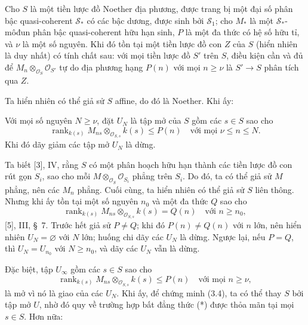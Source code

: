  Cho $S$ là một tiền lược đồ Noether địa phương, được trang
bị một đại số phân bậc quasi-coherent $\mathcal S_*$ có các bậc dương, được
sinh bởi $\mathcal S_1$; cho $M_*$ là một $\mathcal S_*$-môđun phân bậc quasi-coherent
hữu hạn sinh, $P$ là một đa thức có hệ số hữu tỉ, và $\nu$ là một số nguyên.
Khi đó tồn tại một tiền lược đồ con $Z$ của $S$ (hiển nhiên là duy nhất)
có tính chất sau: với mọi tiền lược đồ $S'$ trên $S$, điều kiện cần và đủ để
$M_n\otimes_{\mathcal O_S}\mathcal O_{S'}$ tự do địa phương hạng $P(n)$ với
mọi $n\geq\nu$ là $S'\longrightarrow S$ phân tích qua $Z$.

Ta hiển nhiên có thể giả sử $S$ affine, do đó là Noether. Khi ấy:

 Với mọi số nguyên $N\geq\nu$, đặt $U_N$ là tập mở của $S$
gồm các $s\in S$ sao cho
\[
\operatorname{rank}_{k(s)}
M_{ns}\otimes_{\mathcal O_{S,s}}k(s)\leq P(n)
\quad\text{với mọi $\nu\leq n\leq N$}.
\]
Khi đó dãy giảm các tập mở $U_N$ là dừng.

Ta biết [3], IV, rằng $S$ có một phân hoạch hữu hạn thành các tiền lược đồ con
rút gọn $S_i$, sao cho mỗi $M\otimes_{\mathcal O_S}\mathcal O_{S_i}$ phẳng
trên $S_i$. Do đó, ta có thể giả sử $M$ phẳng, nên các $M_n$ phẳng. Cuối cùng,
ta hiển nhiên có thể giả sử $S$ liên thông. Nhưng khi ấy tồn tại một số nguyên
$n_0$ và một đa thức $Q$ sao cho
\[
\operatorname{rank}_{k(s)}
M_{ns}\otimes_{\mathcal O_{S,s}}k(s)=Q(n)
\quad\text{với $n\geq n_0$},
\]
[5], III, \S~7. Trước hết giả sử $P\neq Q$; khi đó
$P(n)\neq Q(n)$ với $n$ lớn, nên hiển nhiên $U_N=\varnothing$ với $N$ lớn;
huống chi dãy các $U_N$ là dừng. Ngược lại, nếu $P=Q$, thì
$U_N=U_{n_0}$ với $N\geq n_0$, và dãy các $U_N$ vẫn là dừng.

Đặc biệt, tập $U_\infty$ gồm các $s\in S$ sao cho
\[
\tag{*}
\operatorname{rank}_{k(s)}
M_{ns}\otimes_{\mathcal O_{S,s}}k(s)\leq P(n)
\quad\text{với mọi $n\geq\nu$},
\]
là mở vì nó là giao của các $U_N$. Khi ấy, để chứng minh (3.4), ta có thể thay
$S$ bởi tập mở $U$, nhờ đó quy về trường hợp bất đẳng thức (*) được thỏa mãn
tại mọi $s\in S$. Hơn nữa:

